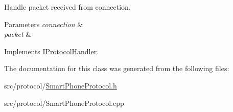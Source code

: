 Handle packet received from connection. 


\begin{DoxyParams}{Parameters}
{\em connection} & \\
\hline
{\em packet} & \\
\hline
\end{DoxyParams}


Implements \hyperlink{class_i_protocol_handler_abcdcfa563b512a954b08bee298e6e1ed}{I\-Protocol\-Handler}.



The documentation for this class was generated from the following files\-:\begin{DoxyCompactItemize}
\item 
src/protocol/\hyperlink{_smart_phone_protocol_8h}{Smart\-Phone\-Protocol.\-h}\item 
src/protocol/Smart\-Phone\-Protocol.\-cpp\end{DoxyCompactItemize}
